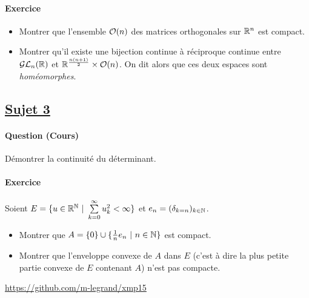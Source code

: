 \documentclass[12pt,a4paper]{report}
\begin{document}
\paragraph*{Exercice} %
\begin{itemize}
\item Montrer que l'ensemble $\mathcal{O}(n)$ des matrices orthogonales sur $\mathbb{R}^n$ est compact.
\item Montrer qu'il existe une bijection continue à réciproque continue entre $\mathcal{G}\mathcal{L}_n(\mathbb{R})$ et $\mathbb{R}^{\frac{n(n+1)}{2}}\times \mathcal{O}(n)$. On dit alors que ces deux espaces sont \emph{homéomorphes}.
\end{itemize}


\subsection*{\underline{Sujet 3}}
\paragraph*{Question (Cours)} %
Démontrer la continuité du déterminant.

\paragraph*{Exercice} %
Soient $E = \{u \in \bR^\bN \ |\ \sum\limits_{k=0}^\infty u_k^2<\infty\}$ et $e_n=(\delta_{k=n})_{k\in\mathbb{N}}$.
\begin{itemize}
\item Montrer que $A=\{0\}\cup\{\frac{1}{n}e_n \ |\ n\in\mathbb{N}\}$ est compact.
\item Montrer que l'enveloppe convexe de $A$ dans $E$ (c'est à dire la plus petite partie convexe de $E$ contenant $A$) n'est pas compacte.
\end{itemize}

\begin{center}
\url{https://github.com/m-legrand/xmp15}
\end{center}
\end{document}
